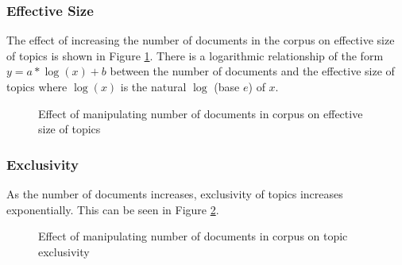 \documentclass[letterpaper, 10 pt, conference]{ieeeconf}  %
\begin{document}
\subsubsection{Effective Size} The effect of increasing the number of documents in the corpus on effective size of topics is shown in Figure \ref{fig:nd_eff_size}. There is a logarithmic relationship of the form $y=a*\log(x)+b$ between the number of documents and the effective size of topics where $\log(x)$ is the natural $\log$ (base $e$) of $x$.
\begin{figure}[thpb]
      \centering
      \caption{Effect of manipulating number of documents in corpus on effective size of topics}
      \label{fig:nd_eff_size}
\end{figure}

\subsubsection{Exclusivity} As the number of documents increases, exclusivity of topics increases exponentially. This can be seen in Figure \ref{fig:nd_exclusivity}. 
\begin{figure}[thpb]
      \centering
      \caption{Effect of manipulating number of documents in corpus on topic exclusivity}
      \label{fig:nd_exclusivity}
\end{figure}
\end{document}
